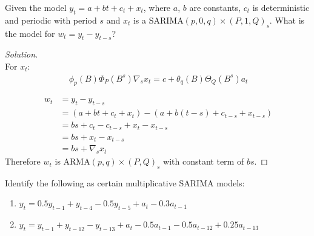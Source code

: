 \documentclass[UTF8,a4paper,14pt]{ctexart}
\newenvironment{solution}
  {\renewcommand\qedsymbol{$\blacksquare$}\begin{proof}[Solution]}
  {\end{proof}}
\theoremstyle{definition}
\theoremstyle{remark}
\begin{document}
\begin{Problem}{}
  Given the model \(y_t=a+bt+c_t+x_t\), where \(a\), \(b\) are constants, \(c_t\)
  is deterministic and periodic with 
  period \(s\) and \(x_t\) is a SARIMA\((p,0,q)\times(P,1,Q)_s\). What is the model for \(w_t=y_t-y_{t-s}\)?
  
\end{Problem}

\begin{solution}\,\\
  For \(x_t\):
  \begin{equation}\
    \begin{aligned}
      \phi_p(B) \Phi_P(B^s) \nabla_s x_{t} = c + \theta_q(B)\Theta_Q(B^s)a_t
    \end{aligned}
  \end{equation}


  \begin{equation}\
    \begin{aligned}
      w_t &= y_t - y_{t-s}\\
      &= (a + bt + c_t + x_t)-(a + b(t-s) + c_{t-s} + x_{t-s})\\
      &= bs + c_t - c_{t-s} + x_{t} - x_{t-s}\\
      &= bs + x_{t} - x_{t-s}\\
      &= bs + \nabla_s x_{t} 
    \end{aligned}
  \end{equation}
  Therefore \({w_t}\) is ARMA\((p,q)\times(P,Q)_s\) with constant term of \(bs\).
\end{solution}

\begin{Problem}{}
  Identify the following as certain multiplicative SARIMA models:
  \begin{enumerate}[label=(\alph*)]
    \item \(y_t=0.5y_{t-1}+y_{t-4}-0.5y_{t-5}+a_t-0.3a_{t-1}\)
    \item \(y_t=y_{t-1}+y_{t-12}-y_{t-13}+a_t-0.5a_{t-1}-0.5a_{t-12}+0.25a_{t-13}\)
  \end{enumerate}
\end{Problem}
\end{document}
